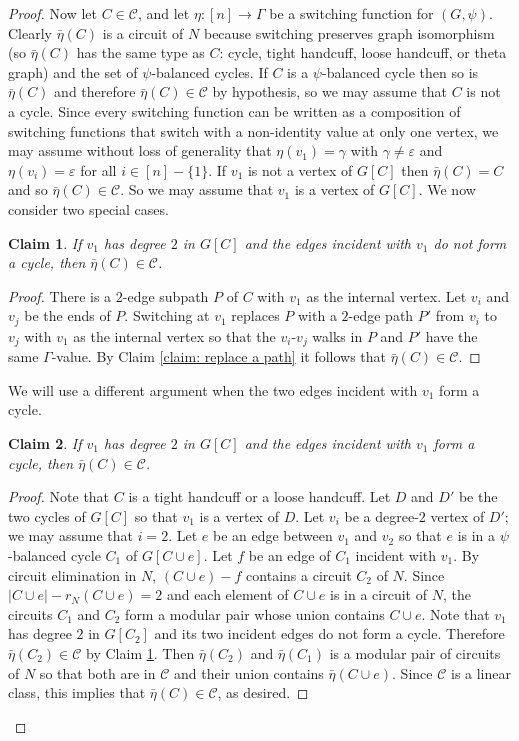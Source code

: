 \documentclass[12pt]{article}
\newtheorem{claim}{Claim}[theorem]
\theoremstyle{definition}
\newcommand{\cC}{\mathcal{C}}
\newcommand{\ep}{\varepsilon}
\begin{document}
\begin{proof}
Now let $C \in \cC$, and let $\eta \colon [n] \to \Gamma$ be a switching function for $(G, \psi)$.
Clearly $\bar{\eta}(C)$ is a circuit of $N$ because switching preserves graph isomorphism (so $\bar{\eta}(C)$ has the same type as $C$: cycle, tight handcuff, loose handcuff, or theta graph) and the set of $\psi$-balanced cycles.
If $C$ is a $\psi$-balanced cycle then so is $\bar{\eta}(C)$ and therefore $\bar{\eta}(C) \in \cC$ by hypothesis, so we may assume that $C$ is not a cycle.
Since every switching function can be written as a composition of switching functions that switch with a non-identity value at only one vertex, we may assume without loss of generality that $\eta(v_1) = \gamma$ with $\gamma \ne \ep$ and $\eta(v_i) = \ep$ for all $i \in [n] - \{1\}$.
If $v_1$ is not a vertex of $G[C]$ then $\bar{\eta}(C) = C$ and so $\bar{\eta}(C) \in \cC$.
So we may assume that $v_1$ is a vertex of $G[C]$.
We now consider two special cases.

\begin{claim} \label{claim: degree-2, not parallel pair}
If $v_1$ has degree $2$ in $G[C]$ and the edges incident with $v_1$ do not form a cycle, then $\bar{\eta}(C) \in \cC$.
\end{claim}
\begin{proof}
There is a $2$-edge subpath $P$ of $C$ with $v_1$ as the internal vertex.
Let $v_i$ and $v_j$ be the ends of $P$.
Switching at $v_1$ replaces $P$ with a $2$-edge path $P'$ from $v_i$ to $v_j$ with $v_1$ as the internal vertex so that the $v_i$-$v_j$ walks in $P$ and $P'$ have the same $\Gamma$-value.
By Claim \ref{claim: replace a path} it follows that $\bar{\eta}(C) \in \cC$.
\end{proof}


We will use a different argument when the two edges incident with $v_1$ form a cycle.

\begin{claim} \label{claim: degree-2, parallel pair}
If $v_1$ has degree $2$ in $G[C]$ and the edges incident with $v_1$ form a cycle, then $\bar\eta(C) \in \cC$.
\end{claim}
\begin{proof}
Note that $C$ is a tight handcuff or a loose handcuff.
Let $D$ and $D'$ be the two cycles of $G[C]$ so that $v_1$ is a vertex of $D$.
Let $v_i$ be a degree-$2$ vertex of $D'$; we may assume that $i = 2$.
Let $e$ be an edge between $v_1$ and $v_2$ so that $e$ is in a $\psi$-balanced cycle $C_1$ of $G[C \cup e]$.
Let $f$ be an edge of $C_1$ incident with $v_1$.
By circuit elimination in $N$, $(C \cup e) - f$ contains a circuit $C_2$ of $N$.
Since $|C \cup e| - r_N(C \cup e) = 2$ and each element of $C \cup e$ is in a circuit of $N$, the circuits $C_1$ and $C_2$ form a modular pair whose union contains $C \cup e$.
Note that $v_1$ has degree $2$ in $G[C_2]$ and its two incident edges do not form a cycle.
Therefore $\bar\eta(C_2) \in \cC$ by Claim \ref{claim: degree-2, not parallel pair}.
Then $\bar\eta(C_2)$ and $\bar\eta(C_1)$ is a modular pair of circuits of $N$ so that both are in $\cC$ and their union contains $\bar\eta(C \cup e)$.
Since $\cC$ is a linear class, this implies that $\bar\eta(C) \in \cC$, as desired.
\end{proof}



\end{proof}
\end{document}
